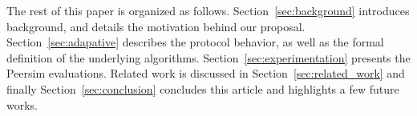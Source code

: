 
The rest of this paper is organized as
follows. Section~\ref{sec:background} introduces background, and
details the motivation behind our proposal.
Section~\ref{sec:adapative} describes the protocol behavior, as well
as the formal definition of the underlying
algorithms. Section~\ref{sec:experimentation} presents the Peersim
evaluations.  Related work is discussed in
Section~\ref{sec:related_work} and finally
Section~\ref{sec:conclusion} concludes this article and highlights a
few future works.
  

